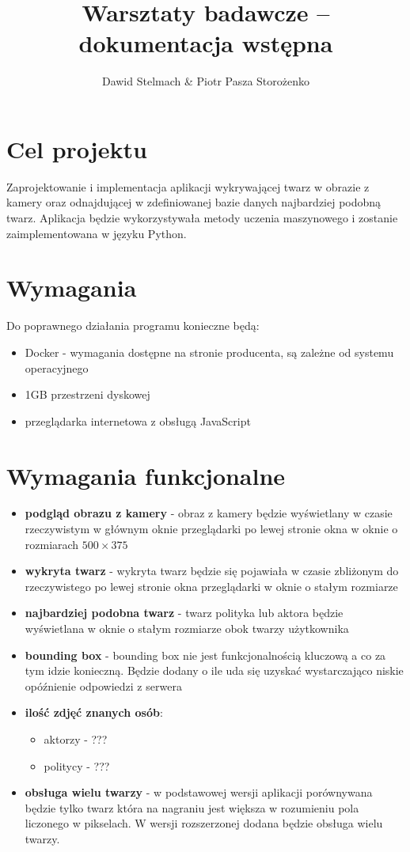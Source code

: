 \documentclass[a4paper]{mwart}
\author{Dawid Stelmach \& Piotr Pasza Storożenko}
\title{Warsztaty badawcze -- dokumentacja wstępna}
\begin{document}
\maketitle

\section{Cel projektu}

Zaprojektowanie i implementacja aplikacji wykrywającej twarz w obrazie z kamery oraz odnajdującej w zdefiniowanej bazie danych najbardziej podobną twarz. Aplikacja będzie wykorzystywała metody uczenia maszynowego i zostanie zaimplementowana w języku Python.

\section{Wymagania}

Do poprawnego działania programu konieczne będą:

\begin{itemize}
	\item Docker - wymagania dostępne na stronie producenta, są zależne od systemu operacyjnego
	\item 1GB przestrzeni dyskowej
	\item przeglądarka internetowa z obsługą JavaScript
\end{itemize}

\section{Wymagania funkcjonalne}
\begin{itemize}
	\item \textbf{podgląd obrazu z kamery} - obraz z kamery będzie wyświetlany w czasie rzeczywistym w głównym oknie przeglądarki po lewej stronie okna w oknie o rozmiarach $500 \times 375$
	\item \textbf{wykryta twarz} - wykryta twarz będzie się pojawiała w czasie zbliżonym do rzeczywistego po lewej stronie okna przeglądarki w oknie o stałym rozmiarze
	\item \textbf{najbardziej podobna twarz} - twarz polityka lub aktora będzie wyświetlana w oknie o stałym rozmiarze obok twarzy użytkownika
	\item \textbf{bounding box} - bounding box nie jest funkcjonalnością kluczową a co za tym idzie konieczną. Będzie dodany o ile uda się uzyskać wystarczająco niskie opóźnienie odpowiedzi z serwera
	\item \textbf{ilość zdjęć znanych osób}:
		\begin{itemize}
			\item aktorzy - ???
			\item politycy - ???
		\end{itemize}
	\item \textbf{obsługa wielu twarzy} - w podstawowej wersji aplikacji porównywana będzie tylko twarz która na nagraniu jest większa w rozumieniu pola liczonego w pikselach. W wersji rozszerzonej dodana będzie obsługa wielu twarzy.
\end{itemize}
\end{document}

